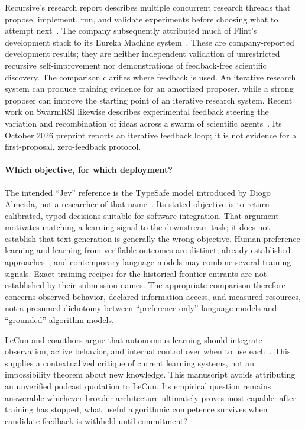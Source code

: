 Recursive's research report describes multiple concurrent research threads
that propose, implement, run, and validate experiments before choosing what
to attempt next~\cite{recursive2026firststeps}. The company subsequently attributed
much of Flint's development stack to its Eureka Machine
system~\cite{recursive2026flint}. These are company-reported development results;
they are neither independent validation of unrestricted recursive
self-improvement nor demonstrations of feedback-free scientific discovery.
The comparison clarifies where feedback is used. An iterative research system
can produce training evidence for an amortized proposer, while a strong
proposer can improve the starting point of an iterative research system.
Recent work on SwarmRSI likewise describes experimental feedback steering the
variation and recombination of ideas across a swarm of scientific
agents~\cite{meng2026swarmrsi}. Its October 2026 preprint reports an iterative
feedback loop; it is not evidence for a first-proposal, zero-feedback protocol.

\paragraph{Which objective, for which deployment?}
The intended ``Jev'' reference is the TypeSafe model introduced by Diogo
Almeida, not a researcher of that name~\cite{typesafe2026jev}. Its stated objective is to
return calibrated, typed decisions suitable for software integration. That
argument motivates matching a learning signal to the downstream task; it
does not establish that text generation is generally the wrong objective.
Human-preference learning and learning from verifiable outcomes are distinct,
already established approaches~\cite{christiano2017rlhf,deepseek2025r1}, and contemporary language
models may combine several training signals. Exact training recipes for the
historical frontier entrants are not established by their submission names.
The appropriate comparison therefore concerns observed behavior, declared
information access, and measured resources, not a presumed dichotomy between
``preference-only'' language models and ``grounded'' algorithm models.

LeCun and coauthors argue that autonomous learning should integrate observation,
active behavior, and internal control over when to use each~\cite{dupoux2026autonomous}.
This supplies a contextualized critique of current learning systems, not an
impossibility theorem about new knowledge. This manuscript avoids attributing
an unverified podcast quotation to LeCun. Its empirical question remains
answerable whichever broader architecture ultimately proves most capable:
after training has stopped, what useful algorithmic competence survives when
candidate feedback is withheld until commitment?

